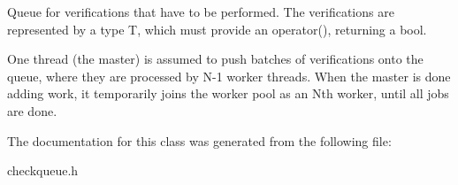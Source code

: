 Queue for verifications that have to be performed. The verifications are represented by a type T, which must provide an operator(), returning a bool.

One thread (the master) is assumed to push batches of verifications onto the queue, where they are processed by N-\/1 worker threads. When the master is done adding work, it temporarily joins the worker pool as an N\textquotesingle{}th worker, until all jobs are done. 

The documentation for this class was generated from the following file\+:\begin{DoxyCompactItemize}
\item 
checkqueue.\+h\end{DoxyCompactItemize}
